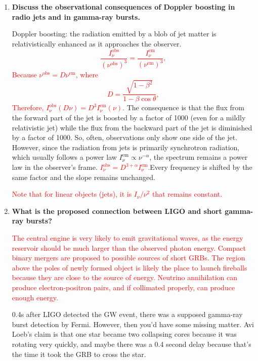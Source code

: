 \documentclass[a4paper]{article}
\begin{document}
\begin{enumerate}
\item \textbf{Discuss the observational consequences of Doppler boosting in radio jets and in gamma-ray bursts.}

Doppler boosting: the radiation emitted by a blob of jet matter is relativistically enhanced as it approaches the observer. \textcolor{red}{\begin{equation}
\frac{I_{\nu}^\textrm{obs}}{(\nu^\textrm{obs})^3}=\frac{I_\nu^\textrm{em}}{(\nu^\textrm{em})^3}, 
\end{equation}
Because $\nu^\textrm{obs}=D\nu^\textrm{em}$, where 
\begin{equation}
D=\frac{\sqrt{1-\beta^2}}{1-\beta\cos\theta},
\end{equation}
Therefore, $I_{\nu}^\textrm{obs}(D\nu)=D^3I_{\nu}^\textrm{em}(\nu)$.
} The consequence is that the flux from the forward part of the jet is boosted by a factor of 1000 (even for a mildly relativistic jet) while the flux from the backward part of the jet is diminished by a factor of 1000. So, often, observations only show one side of the jet. However, since the radiation from jets is primarily synchrotron radiation, which usually follows a power law $I_\nu^{\mathrm{em}} \propto \nu^{-\alpha}$, the spectrum remains a power law in the observer's frame. \textcolor{red}{$I_{\nu}^\textrm{obs}=D^{3+\alpha}I_{\nu}^\textrm{em}$.}Every frequency is shifted by the same factor and the slope remains unchanged. 

\textcolor{red}{Note that for linear objects (jets), it is $I_\nu/\nu^2$ that remains constant. }

\item \textbf{What is the proposed connection between LIGO and short gamma-ray bursts?}

\textcolor{red}{The central engine is very likely to emit gravitational waves, as the energy reservoir should be much larger than the observed photon energy. Compact binary mergers are proposed to possible sources of short GRBs. The region above the poles of newly formed object is likely the place to launch fireballs because they are close to the source of energy. Neutrino annihilation can produce electron-positron pairs, and if collimated properly, can produce enough energy. }

0.4s after LIGO detected the GW event, there was a supposed gamma-ray burst detection by Fermi. However, then you'd have some missing matter. Avi Loeb's claim is that one star became two collapsing cores because it was rotating very quickly, and maybe there was a 0.4 second delay because that's the time it took the GRB to cross the star. 

\end{enumerate}
\end{document}
